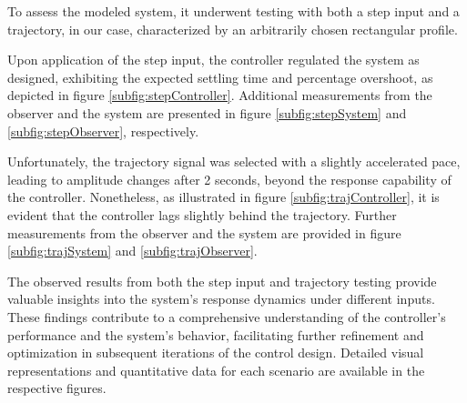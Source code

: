 To assess the modeled system, it underwent testing with both a step input and a trajectory, in our case, characterized by an arbitrarily chosen rectangular profile.

Upon application of the step input, the controller regulated the system as designed, exhibiting the expected settling time and percentage overshoot, as depicted in figure \ref{subfig:stepController}. Additional measurements from the observer and the system are presented in figure \ref{subfig:stepSystem} and \ref{subfig:stepObserver}, respectively.

Unfortunately, the trajectory signal was selected with a slightly accelerated pace, leading to amplitude changes after 2 seconds, beyond the response capability of the controller. Nonetheless, as illustrated in figure \ref{subfig:trajController}, it is evident that the controller lags slightly behind the trajectory. Further measurements from the observer and the system are provided in figure \ref{subfig:trajSystem} and \ref{subfig:trajObserver}.

The observed results from both the step input and trajectory testing provide valuable insights into the system's response dynamics under different inputs. These findings contribute to a comprehensive understanding of the controller's performance and the system's behavior, facilitating further refinement and optimization in subsequent iterations of the control design. Detailed visual representations and quantitative data for each scenario are available in the respective figures.